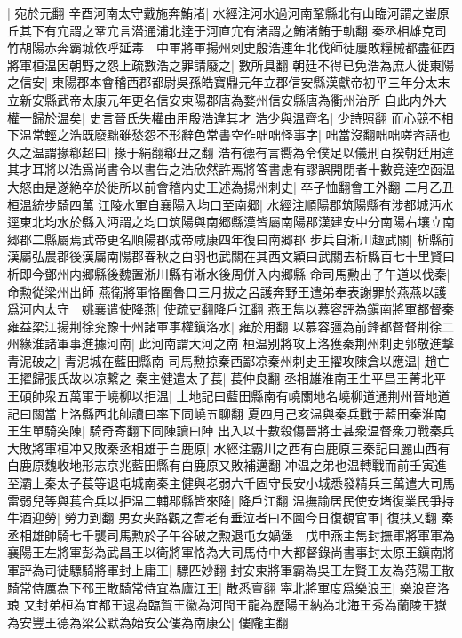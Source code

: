 |{
	宛於元翻}
辛酉河南太守戴施奔鮪渚|{
	水經注河水過河南鞏縣北有山臨河謂之崟原丘其下有宂謂之鞏宂言潜通浦北逹于河直宂有渚謂之鮪渚鮪于軌翻}
秦丞相雄克司竹胡陽赤奔霸城依呼延毒　中軍將軍揚州刺史殷浩連年北伐師徒屢敗糧械都盡征西將軍桓温因朝野之怨上疏數浩之罪請廢之|{
	數所具翻}
朝廷不得已免浩為庶人徙東陽之信安|{
	東陽郡本會稽西郡都尉吳孫皓寶鼎元年立郡信安縣漢獻帝初平三年分太末立新安縣武帝太康元年更名信安東陽郡唐為婺州信安縣唐為衢州治所}
自此内外大權一歸於温矣|{
	史言晉氏失權由用殷浩違其才}
浩少與温齊名|{
	少詩照翻}
而心競不相下温常輕之浩既廢黜雖愁怨不形辭色常書空作咄咄怪事字|{
	咄當沒翻咄咄嗟咨語也}
久之温謂掾郗超曰|{
	掾于絹翻郗丑之翻}
浩有德有言嚮為令僕足以儀刑百揆朝廷用違其才耳將以浩爲尚書令以書告之浩欣然許焉將答書慮有謬誤開閉者十數竟逹空函温大怒由是遂絶卒於徙所以前會稽内史王述為揚州刺史|{
	卒子恤翻會工外翻}
二月乙丑桓温統步騎四萬江陵水軍自襄陽入均口至南郷|{
	水經注順陽郡筑陽縣有涉都城沔水逕東北均水於縣入沔謂之均口筑陽與南郷縣漢皆屬南陽郡漢建安中分南陽右壤立南郷郡二縣屬焉武帝更名順陽郡成帝咸康四年復曰南郷郡}
步兵自淅川趣武關|{
	析縣前漢屬弘農郡後漢屬南陽郡春秋之白羽也武關在其西文穎曰武關去析縣百七十里賢曰析即今鄧州内郷縣後魏置淅川縣有淅水後周併入内郷縣}
命司馬勲出子午道以伐秦|{
	命勲從梁州出師}
燕衛將軍恪圍魯口三月拔之呂護奔野王遣弟奉表謝罪於燕燕以護爲河内太守　姚襄遣使降燕|{
	使疏吏翻降戶江翻}
燕王雋以慕容評為鎭南將軍都督秦雍益梁江揚荆徐兖豫十州諸軍事權鎭洛水|{
	雍於用翻}
以慕容彊為前鋒都督督荆徐二州緣淮諸軍事進據河南|{
	此河南謂大河之南}
桓温别將攻上洛獲秦荆州刺史郭敬進撃青泥破之|{
	青泥城在藍田縣南}
司馬勲掠秦西鄙凉秦州刺史王擢攻陳倉以應温|{
	趙亡王擢歸張氏故以凉繋之}
秦主健遣太子萇|{
	萇仲良翻}
丞相雄淮南王生平昌王菁北平王碩帥衆五萬軍于嶢柳以拒温|{
	土地記曰藍田縣南有嶢關地名嶢柳道通荆州晉地道記曰關當上洛縣西北帥讀曰率下同嶢五聊翻}
夏四月己亥温與秦兵戰于藍田秦淮南王生單騎突陳|{
	騎奇寄翻下同陳讀曰陣}
出入以十數殺傷晉將士甚衆温督衆力戰秦兵大敗將軍桓冲又敗秦丞相雄于白鹿原|{
	水經注霸川之西有白鹿原三秦記曰麗山西有白鹿原魏收地形志京兆藍田縣有白鹿原又敗補邁翻}
冲温之弟也温轉戰而前壬寅進至灞上秦太子萇等退屯城南秦主健與老弱六千固守長安小城悉發精兵三萬遣大司馬雷弱兒等與萇合兵以拒温二輔郡縣皆來降|{
	降戶江翻}
温撫諭居民使安堵復業民爭持牛酒迎勞|{
	勞力到翻}
男女夹路觀之耆老有垂泣者曰不圖今日復覩官軍|{
	復扶又翻}
秦丞相雄帥騎七千襲司馬勲於子午谷破之勲退屯女媧堡　戊申燕主雋封撫軍將軍軍為襄陽王左將軍彭為武昌王以衛將軍恪為大司馬侍中大都督錄尚書事封太原王鎭南將軍評為司徒驃騎將軍封上庸王|{
	驃匹妙翻}
封安東將軍霸為吳王左賢王友為范陽王散騎常侍厲為下邳王散騎常侍宜為廬江王|{
	散悉亶翻}
寜北將軍度爲樂浪王|{
	樂浪音洛琅}
又封弟桓為宜都王逮為臨賀王徽為河間王龍為歷陽王納為北海王秀為蘭陵王嶽為安豐王德為梁公默為始安公僂為南康公|{
	僂隴主翻}
